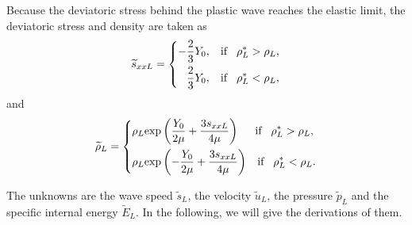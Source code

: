 \documentclass{article}
\numberwithin{equation}{section}
\numberwithin{table}{section}
\begin{document}
Because the deviatoric stress behind the plastic wave reaches the elastic limit, the deviatoric stress and density are taken as
\begin{equation}
  \widetilde{s}_{xxL} =\left\{ \begin{aligned}
	  -\frac{2}{3}Y_0, \hspace{0.3cm} \text{if} \hspace{0.3cm} \rho_L^* > \rho_L,\\
	  \frac{2}{3}Y_0, \hspace{0.3cm} \text{if} \hspace{0.3cm} \rho_L^* < \rho_L,\\
	\end{aligned}\right.
  \end{equation}
  and
\begin{equation}   \widetilde{\rho}_{L} = \left\{ \begin{aligned}
	  & \rho_L \text{exp}\left(\frac{Y_0}{2\mu}+\frac{3 s_{xxL}}{4\mu}\right)  \hspace{0.5cm} \text{if} \hspace{0.3cm} \rho_L^* > \rho_L,\\
& \rho_L \text{exp}\left(-\frac{Y_0}{2\mu}+\frac{3 s_{xxL}}{4\mu}\right)
\hspace{0.3cm} \text{if} \hspace{0.3cm} \rho_L^* < \rho_L.\\
  \end{aligned}\right.
 \end{equation}

 The unknowns are the wave speed $\widetilde{s}_L$,  the velocity  $\widetilde{u}_L$, the pressure $\widetilde{p}_L$ and the specific internal energy $\widetilde{E}_L$. In the following, we will give the derivations of them.
\end{document}
